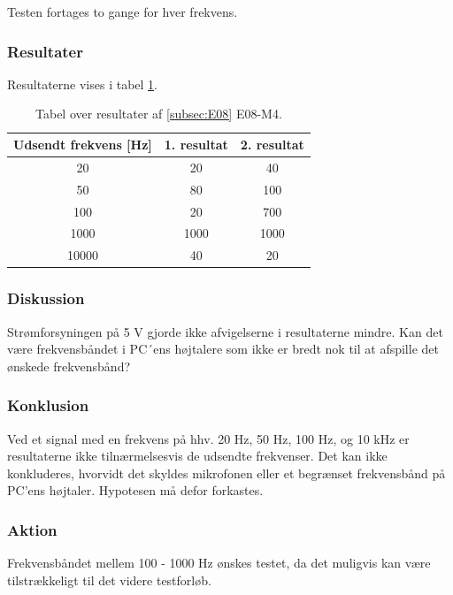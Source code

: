 			Testen fortages to gange for hver frekvens.  
		
		\subsubsection{Resultater}
		Resultaterne vises i tabel \ref{E08resultater}. 
		\begin{table}[htb]
				\centering
				\caption{Tabel over resultater af \ref{subsec:E08} E08-M4.} 
				\label{E08resultater}
				\begin{tabular}{ccc}
					\multicolumn{1}{c|}{\textbf{Udsendt frekvens {[}Hz{]}}} & 	
					\multicolumn{1}{c|}{\textbf{1. resultat}} & \textbf{2. resultat} \\ \hline
					\multicolumn{1}{c|}{20}& 
					\multicolumn{1}{c|}{20}&40\\
					\multicolumn{1}{c|}{50}& 
					\multicolumn{1}{c|}{80}&100\\
					\multicolumn{1}{c|}{100}& 
					\multicolumn{1}{c|}{20}&700\\
					\multicolumn{1}{c|}{1000}& 
					\multicolumn{1}{c|}{1000}&1000\\
					\multicolumn{1}{c|}{10000}& 
					\multicolumn{1}{c|}{40}&20\\ 
				\end{tabular}
			\end{table}
		
		\subsubsection{Diskussion} 
		Strømforsyningen på 5 V gjorde ikke afvigelserne i resultaterne mindre. Kan det være frekvensbåndet i PC´ens højtalere som ikke er bredt nok til at afspille det ønskede frekvensbånd? 
		\subsubsection{Konklusion}
	Ved et signal med en frekvens på hhv. 20 Hz, 50 Hz, 100 Hz, og 10 kHz er resultaterne ikke tilnærmelsesvis de udsendte frekvenser. 
	Det kan ikke konkluderes, hvorvidt det skyldes mikrofonen eller et begrænset frekvensbånd på PC'ens højtaler. Hypotesen må defor forkastes. 
		\subsubsection{Aktion}
		Frekvensbåndet mellem 100 - 1000 Hz ønskes testet, da det muligvis kan være tilstrækkeligt til det videre testforløb.  
		

